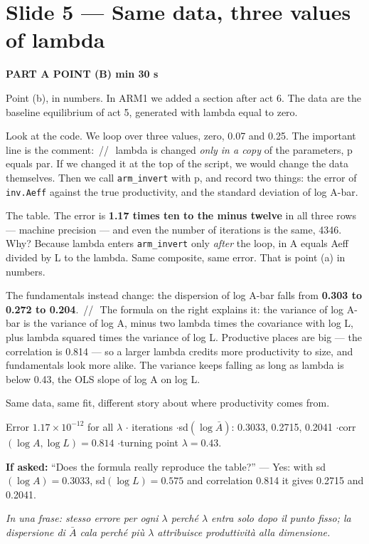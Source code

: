 \documentclass[11pt,a4paper]{article}
\newcommand{\slide}[3]{\Needspace{14\baselineskip}\section{#1}\textcolor{unicared}{\small\bfseries\MakeUppercase{#3}\quad\textperiodcentered\quad #2}\par}
\newcommand{\idea}[1]{\par{\small\itshape\color{unicablue}In una frase: #1}\par}
\newcommand{\pause}{\textcolor{unicared}{\,/\!/\,}}
\begin{document}
\slide{Slide 5 --- Same data, three values of lambda}{1 min 30 s}{Part A \textperiodcentered{} point (b)}

\begin{say}
Point (b), in numbers. In ARM1 we added a section after act 6. The data are the baseline equilibrium of act 5, generated with lambda equal to zero.

Look at the code. We loop over three values, zero, 0.07 and 0.25. The important line is the comment: \pause\ lambda is changed \emph{only in a copy} of the parameters, p equals par. If we changed it at the top of the script, we would change the data themselves. Then we call \texttt{arm\_invert} with p, and record two things: the error of \texttt{inv.Aeff} against the true productivity, and the standard deviation of log A-bar.

The table. The error is \textbf{1.17 times ten to the minus twelve} in all three rows --- machine precision --- and even the number of iterations is the same, 4346. Why? Because lambda enters \texttt{arm\_invert} only \emph{after} the loop, in A equals Aeff divided by L to the lambda. Same composite, same error. That is point (a) in numbers.

The fundamentals instead change: the dispersion of log A-bar falls from \textbf{0.303 to 0.272 to 0.204}. \pause\ The formula on the right explains it: the variance of log A-bar is the variance of log A, minus two lambda times the covariance with log L, plus lambda squared times the variance of log L. Productive places are big --- the correlation is 0.814 --- so a larger lambda credits more productivity to size, and fundamentals look more alike. The variance keeps falling as long as lambda is below 0.43, the OLS slope of log A on log L.

Same data, same fit, different story about where productivity comes from.
\end{say}

\begin{nums}
Error $1.17\times10^{-12}$ for all $\lambda$ \quad$\cdot$ iterations \quad$\cdot$\quad sd$(\log\bar A)$: 0.3033, 0.2715, 0.2041 \quad$\cdot$\quad corr$(\log A,\log L) = 0.814$ \quad$\cdot$\quad turning point $\lambda = 0.43$.
\end{nums}
\begin{ask}
\textbf{If asked:} ``Does the formula really reproduce the table?'' --- Yes: with sd$(\log A) = 0.3033$, sd$(\log L) = 0.575$ and correlation 0.814 it gives 0.2715 and 0.2041.
\end{ask}
\idea{stesso errore per ogni $\lambda$ perché $\lambda$ entra solo dopo il punto fisso; la dispersione di $\bar A$ cala perché più $\lambda$ attribuisce produttività alla dimensione.}
\end{document}
